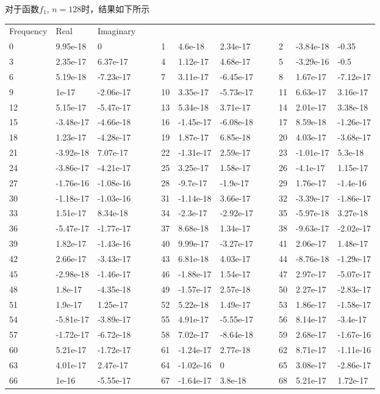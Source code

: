 \documentclass[english]{ctexart}
\providecommand{\tabularnewline}{\\}
\begin{document}
对于函数$f_{1}$, $n=128$时，结果如下所示

\begin{tabular}{lllllllllllll}
Frequency & Real & Imaginary &  &  &  &  &  &  &  &  &  & \tabularnewline
0 & 9.95e-18 & 0 &  &  & 1 & 4.6e-18 & 2.34e-17 &  &  & 2 & -3.84e-18 & -0.35\tabularnewline
3 & 2.35e-17 & 6.37e-17 &  &  & 4 & 1.12e-17 & 4.68e-17 &  &  & 5 & -3.29e-16 & -0.5\tabularnewline
6 & 5.19e-18 & -7.23e-17 &  &  & 7 & 3.11e-17 & -6.45e-17 &  &  & 8 & 1.67e-17 & -7.12e-17\tabularnewline
9 & 1e-17 & -2.06e-17 &  &  & 10 & 3.35e-17 & -5.73e-17 &  &  & 11 & 6.63e-17 & 3.16e-17\tabularnewline
12 & 5.15e-17 & -5.47e-17 &  &  & 13 & 5.34e-18 & 3.71e-17 &  &  & 14 & 2.01e-17 & 3.38e-18\tabularnewline
15 & -3.48e-17 & -4.66e-18 &  &  & 16 & -1.45e-17 & -6.08e-18 &  &  & 17 & 8.59e-18 & -1.26e-17\tabularnewline
18 & 1.23e-17 & -4.28e-17 &  &  & 19 & 1.87e-17 & 6.85e-18 &  &  & 20 & 4.03e-17 & -3.68e-17\tabularnewline
21 & -3.92e-18 & 7.07e-17 &  &  & 22 & -1.31e-17 & 2.59e-17 &  &  & 23 & -1.01e-17 & 5.3e-18\tabularnewline
24 & -3.86e-17 & -4.21e-17 &  &  & 25 & 3.25e-17 & 1.58e-17 &  &  & 26 & -4.1e-17 & 1.15e-17\tabularnewline
27 & -1.76e-16 & -1.08e-16 &  &  & 28 & -9.7e-17 & -1.9e-17 &  &  & 29 & 1.76e-17 & -1.4e-16\tabularnewline
30 & -1.18e-17 & -1.03e-16 &  &  & 31 & -1.14e-18 & 3.66e-17 &  &  & 32 & -3.39e-17 & -1.86e-17\tabularnewline
33 & 1.51e-17 & 8.34e-18 &  &  & 34 & -2.3e-17 & -2.92e-17 &  &  & 35 & -5.97e-18 & 3.27e-18\tabularnewline
36 & -5.47e-17 & -1.77e-17 &  &  & 37 & 8.68e-18 & 1.34e-17 &  &  & 38 & -9.63e-17 & -2.02e-17\tabularnewline
39 & 1.82e-17 & -1.43e-16 &  &  & 40 & 9.99e-17 & -3.27e-17 &  &  & 41 & 2.06e-17 & 1.48e-17\tabularnewline
42 & 2.66e-17 & -3.43e-17 &  &  & 43 & 6.81e-18 & 4.03e-17 &  &  & 44 & -8.76e-18 & -1.29e-17\tabularnewline
45 & -2.98e-18 & -1.46e-17 &  &  & 46 & -1.88e-17 & 1.54e-17 &  &  & 47 & 2.97e-17 & -5.07e-17\tabularnewline
48 & 1.8e-17 & -4.35e-18 &  &  & 49 & -1.57e-17 & 2.57e-18 &  &  & 50 & 2.27e-17 & -2.83e-17\tabularnewline
51 & 1.9e-17 & 1.25e-17 &  &  & 52 & 5.22e-18 & 1.49e-17 &  &  & 53 & 1.86e-17 & -1.58e-17\tabularnewline
54 & -5.81e-17 & -3.89e-17 &  &  & 55 & 4.91e-17 & -5.55e-17 &  &  & 56 & 8.14e-17 & -3.4e-17\tabularnewline
57 & -1.72e-17 & -6.72e-18 &  &  & 58 & 7.02e-17 & -8.64e-18 &  &  & 59 & 2.68e-17 & -1.67e-16\tabularnewline
60 & 5.21e-17 & -1.72e-17 &  &  & 61 & -1.24e-17 & 2.77e-18 &  &  & 62 & 8.71e-17 & -1.11e-16\tabularnewline
63 & 4.01e-17 & 2.47e-17 &  &  & 64 & -1.02e-16 & 0 &  &  & 65 & 3.08e-17 & -2.86e-17\tabularnewline
66 & 1e-16 & -5.55e-17 &  &  & 67 & -1.64e-17 & 3.8e-18 &  &  & 68 & 5.21e-17 & 1.72e-17\tabularnewline

\end{tabular}
\end{document}
